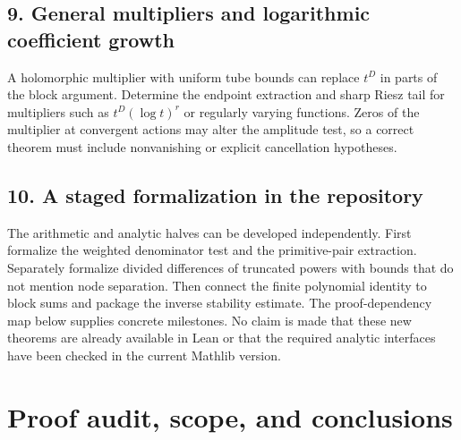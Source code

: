 \documentclass[11pt,a4paper]{article}
\numberwithin{equation}{section}
\theoremstyle{definition}
\theoremstyle{remark}
\begin{document}
\subsection*{9. General multipliers and logarithmic coefficient growth}
A holomorphic multiplier with uniform tube bounds can replace $t^D$ in
parts of the block argument. Determine the endpoint extraction and
sharp Riesz tail for multipliers such as
$t^D(\log t)^r$ or regularly varying functions. Zeros of the multiplier
at convergent actions may alter the amplitude test, so a correct theorem
must include nonvanishing or explicit cancellation hypotheses.

\subsection*{10. A staged formalization in the repository}
The arithmetic and analytic halves can be developed independently.
First formalize the weighted denominator test and the primitive-pair
extraction. Separately formalize divided differences of truncated
powers with bounds that do not mention node separation. Then connect
the finite polynomial identity to block sums and package the inverse
stability estimate. The proof-dependency map below supplies concrete
milestones. No claim is made that these new theorems are already
available in Lean or that the required analytic interfaces have been
checked in the current Mathlib version.

\section{Proof audit, scope, and conclusions}
\label{sec:audit}
\end{document}
